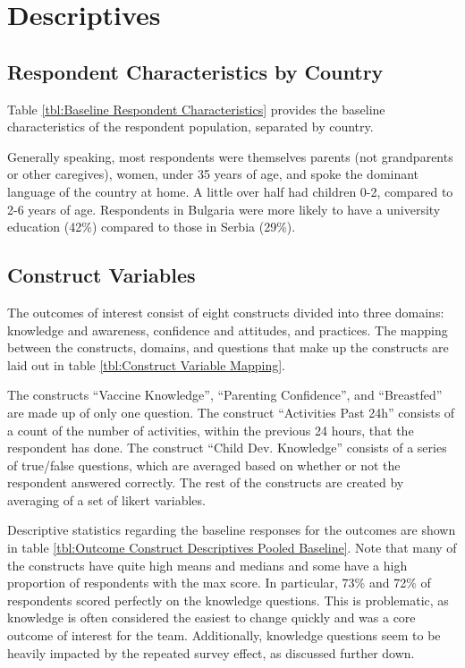 \documentclass{article}
\begin{document}
\section{Descriptives}


\subsection*{Respondent Characteristics by Country}

Table \ref{tbl:Baseline Respondent Characteristics} provides the baseline characteristics of the respondent population, separated by country.

Generally speaking, most respondents were themselves parents (not grandparents or other caregives), women, under 35 years of age, and spoke the dominant language of the country at home. A little over half had children 0-2, compared to 2-6 years of age. Respondents in Bulgaria were more likely to have a university education (42\%) compared to those in Serbia (29\%).



\subsection*{Construct Variables}

The outcomes of interest consist of eight constructs divided into three domains: knowledge and awareness, confidence and attitudes, and practices. The mapping between the constructs, domains, and questions that make up the constructs are laid out in table \ref{tbl:Construct Variable Mapping}.

The constructs ``Vaccine Knowledge'', ``Parenting Confidence'', and ``Breastfed'' are made up of only one question. The construct ``Activities Past 24h'' consists of a count of the number of activities, within the previous 24 hours, that the respondent has done. The construct ``Child Dev. Knowledge'' consists of a series of true/false questions, which are averaged based on whether or not the respondent answered correctly. The rest of the constructs are created by averaging of a set of likert variables.

Descriptive statistics regarding the baseline responses for the outcomes are shown in table \ref{tbl:Outcome Construct Descriptives Pooled Baseline}. Note that many of the constructs have quite high means and medians and some have a high proportion of respondents with the max score. In particular, 73\% and 72\% of respondents scored perfectly on the knowledge questions. This is problematic, as knowledge is often considered the easiest to change quickly and was a core outcome of interest for the team. Additionally, knowledge questions seem to be heavily impacted by the repeated survey effect, as discussed further down.
\end{document}
